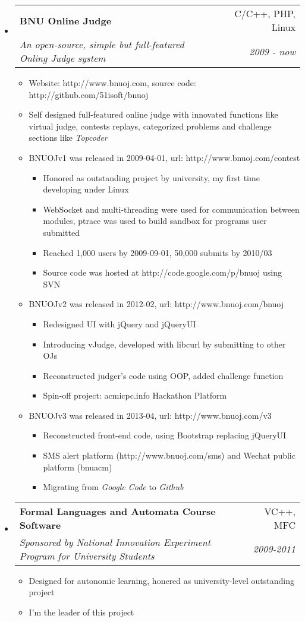 \documentclass[letterpaper,11pt]{article}
\makeatletter
\newcommand{\resitem}[1]{\item #1 \vspace{0pt}}
\newcommand{\ressubheading}[4]{
    \begin{tabular*}{6.5in}{l@{\cftdotfill{\cftsecdotsep}\extracolsep{\fill}}r}
        \textbf{#1} & #2 \\
        \textit{#3} & \textit{#4} \\
    \end{tabular*}\vspace{-6pt}
}
\makeatother
\begin{document}
    \begin{itemize}
        \item
            \ressubheading{BNU Online Judge}{C/C++, PHP, Linux}{An open-source, simple but full-featured Onling Judge system}{2009 - now}
            \begin{itemize}
                \resitem{Website: http://www.bnuoj.com, source code: http://github.com/51isoft/bnuoj}
                \resitem{Self designed full-featured online judge with innovated functions like virtual judge, contests replays, categorized problems and challenge sections like {\it Topcoder} }
                \resitem{BNUOJv1 was released in 2009-04-01, url: http://www.bnuoj.com/contest}
                \begin{itemize}
                    \resitem{Honored as outstanding project by university, my first time developing under Linux}
                    \resitem{WebSocket and multi-threading were used for communication between modules, ptrace was used to build sandbox for programs user submitted}
                    \resitem{Reached 1,000 users by 2009-09-01, 50,000 submits by 2010/03}
                    \resitem{Source code was hosted at http://code.google.com/p/bnuoj using SVN}
                \end{itemize}
                \resitem{BNUOJv2 was released in 2012-02, url: http://www.bnuoj.com/bnuoj}
                \begin{itemize}
                    \resitem{Redesigned UI with jQuery and jQueryUI}
                    \resitem{Introducing vJudge, developed with libcurl by submitting to other OJs}
                    \resitem{Reconstructed judger's code using OOP, added challenge function}
                    \resitem{Spin-off project: acmicpc.info Hackathon Platform}
                \end{itemize}
                \resitem{BNUOJv3 was released in 2013-04, url: http://www.bnuoj.com/v3}
                \begin{itemize}
                    \resitem{Reconstructed front-end code, using Bootstrap replacing jQueryUI}
                    \resitem{SMS alert platform (http://www.bnuoj.com/sms) and Wechat public platform (bnuacm) }
                    \resitem{Migrating from {\it Google Code} to {\it Github}}
                \end{itemize}
            \end{itemize}
        \item
            \ressubheading{Formal Languages and Automata Course Software}{VC++, MFC}{Sponsored by National Innovation Experiment Program for University Students}{2009-2011}
            \begin{itemize}
                \resitem{Designed for autonomic learning, honered as university-level outstanding project}
                \resitem{I'm the leader of this project}
            \end{itemize}
    \end{itemize}
\end{document}
